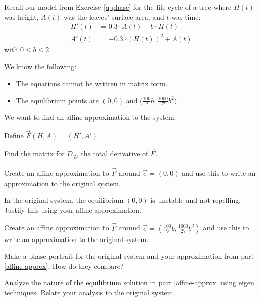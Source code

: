 \documentclass{workbook}
\begin{document}
\begin{slide}

	Recall our model from Exercise \ref{q-phase} for the life cycle of a tree where $H(t)$ was
	height, $A(t)$ was the leaves' surface area, and $t$ was time:
	\begin{align*}
		H'(t) &= 0.3\cdot A(t)-b\cdot H(t)\\
		A'(t) &= -0.3\cdot (H(t))^2 + A(t)
	\end{align*}
	with $0 \leq b \leq 2$

	\bigskip
	
	We know the following:
	\begin{itemize}
		\item The equations cannot be written in matrix form.
		\item The equilibrium points are $(0,0)$ and $\Big(\frac{100}{9}b,\frac{1000}{27}b^2\Big)$.			
	\end{itemize}	

	We want to find an affine approximation to the system.

	Define $\vec F(H,A)=(H', A')$
	\begin{parts}
		\item Find the matrix for $D_{\vec F}$, the total derivative of $\vec F$.
		\item Create an affine approximation to $\vec F$ around $\vec e=(0,0)$ and use this to write an approximation to the original system.
		\item In the original system, the equilibrium $(0,0)$ is unstable and not repelling. Justify this using your affine approximation.
		\item\label{affine-approx}
		 Create an affine approximation to $\vec F$ around $\vec e=(\frac{100}{9}b,\frac{1000}{27}b^2)$ and use this to write an approximation to the original system.
		
		\item Make a phase portrait for the original system and your approximation from part \ref{affine-approx}. How do they compare?
		\item Analyze the nature of the equilibrium solution in part \ref{affine-approx} using eigen techniques. Relate your analysis to
		the original system.

	\end{parts}
\end{slide}
\end{document}
